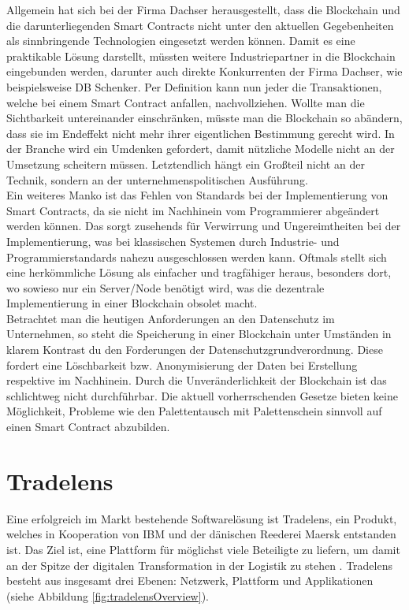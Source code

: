 Allgemein hat sich bei der Firma Dachser herausgestellt, dass die Blockchain und die darunterliegenden Smart Contracts nicht unter den aktuellen Gegebenheiten als sinnbringende Technologien eingesetzt werden können. Damit es eine praktikable Lösung darstellt, müssten weitere Industriepartner in die Blockchain eingebunden werden, darunter auch direkte Konkurrenten der Firma Dachser, wie beispielsweise DB Schenker. Per Definition kann nun jeder die Transaktionen, welche bei einem Smart Contract anfallen, nachvollziehen. Wollte man die Sichtbarkeit untereinander einschränken, müsste man die Blockchain so abändern, dass sie im Endeffekt nicht mehr ihrer eigentlichen Bestimmung gerecht wird. In der Branche wird ein Umdenken gefordert, damit nützliche Modelle nicht an der Umsetzung scheitern müssen. Letztendlich hängt ein Großteil nicht an der Technik, sondern an der unternehmenspolitischen Ausführung.\\
Ein weiteres Manko ist das Fehlen von Standards bei der Implementierung von Smart Contracts, da sie nicht im Nachhinein vom Programmierer abgeändert werden können. Das sorgt zusehends für Verwirrung und Ungereimtheiten bei der Implementierung, was bei klassischen Systemen durch Industrie- und Programmierstandards nahezu ausgeschlossen werden kann. Oftmals stellt sich eine herkömmliche Lösung als einfacher und tragfähiger heraus, besonders dort, wo sowieso nur ein Server/Node benötigt wird, was die dezentrale Implementierung in einer Blockchain obsolet macht.\\
Betrachtet man die heutigen Anforderungen an den Datenschutz im Unternehmen, so steht die Speicherung in einer Blockchain unter Umständen in klarem Kontrast du den Forderungen der Datenschutzgrundverordnung. Diese fordert eine Löschbarkeit bzw. Anonymisierung der Daten bei Erstellung respektive im Nachhinein. Durch die Unveränderlichkeit der Blockchain ist das schlichtweg nicht durchführbar. Die aktuell vorherrschenden Gesetze bieten keine Möglichkeit, Probleme wie den Palettentausch mit Palettenschein sinnvoll auf einen Smart Contract abzubilden.

\section{Tradelens}
Eine erfolgreich im Markt bestehende Softwarelösung ist Tradelens, ein Produkt, welches in Kooperation von IBM und der dänischen Reederei Maersk entstanden ist. Das Ziel ist, eine Plattform für möglichst viele Beteiligte zu liefern, um damit an der Spitze der digitalen Transformation in der Logistik zu stehen \cite[vgl.][S. 7]{Tradelens2019b}. Tradelens besteht aus insgesamt drei Ebenen: Netzwerk, Plattform und Applikationen (siehe Abbildung \ref{fig:tradelensOverview}).

